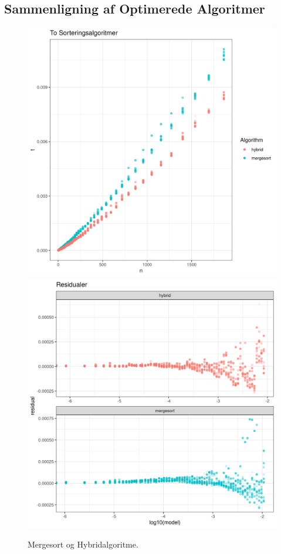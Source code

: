 \subsection{Sammenligning af Optimerede Algoritmer}%
\label{sub:Sammenligning af Optimerede Algoritmer}


\begin{figure}
	\begin{center}
		\includegraphics[scale=0.4]{../img/toMergesort.png}
		\includegraphics[scale=0.4]{../img/toMergesortResidual.png}
	\end{center}
	\caption{Mergesort og Hybridalgoritme.}
	\label{fig:Mergesort og Hybridalgoritme}
\end{figure}

